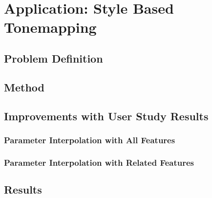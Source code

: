 \chapter{Application: Style Based Tonemapping}
\label{chp:b5}

\section{Problem Definition}
\section{Method}
\section{Improvements with User Study Results}
\subsection{Parameter Interpolation with All Features}
\subsection{Parameter Interpolation with Related Features}
\section{Results}
